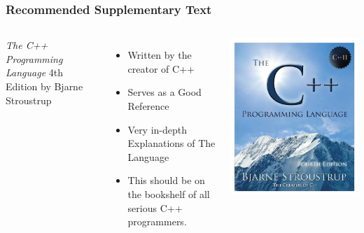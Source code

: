 \documentclass[handout]{beamer}
\begin{document}
\begin{frame}
   \frametitle{Recommended Supplementary Text}
   \begin{columns}
      {\em The C++ Programming Language} 4th Edition by Bjarne Stroustrup
      \begin{itemize}
         \item Written by the creator of C++
         \item Serves as a Good Reference
         \item Very in-depth Explanations of The Language
         \item This should be on the bookshelf of all serious C++ programmers.
      \end{itemize}
      \includegraphics[width=\textwidth]{images/stroustrup}
   \end{columns}
\end{frame}
\end{document}
